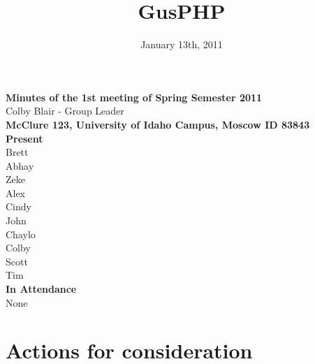 \documentclass[12pt]{article}
\title{GusPHP}
\date{January 13th, 2011}
\begin{document}
\maketitle
 
\textbf{Minutes of the 1st meeting of Spring Semester 2011} \\
Colby Blair - Group Leader\\
\textbf{McClure 123, University of Idaho Campus, Moscow ID 83843} \\
\textbf{Present}\\
Brett\\
Abhay\\
Zeke\\
Alex\\
Cindy\\
John\\
Chaylo\\
Colby\\
Scott\\
Tim\\
\textbf{In Attendance}\\
None \\
\section{Actions for consideration} \\
\end{document}
